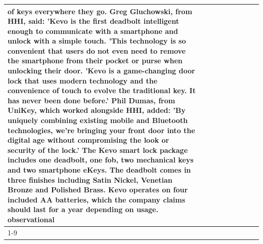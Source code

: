 \begin{table}[H]
\begin{tabular}{lllrlllll}
of keys everywhere they go. Greg Gluchowski, from HHI, said: 'Kevo is the first deadbolt intelligent enough to communicate with a smartphone and unlock with a simple touch. 'This technology is so convenient that users do not even need to remove the smartphone from their pocket or purse when unlocking their door. 'Kevo is a game-changing door lock that uses modern technology and the convenience of touch to evolve the traditional key. It has never been done before.' Phil Dumas, from UniKey, which worked alongside HHI, added: 'By uniquely combining existing mobile and Bluetooth technologies, we’re bringing your front door into the digital age without compromising the look or security of the lock.' The Kevo smart lock package includes one deadbolt, one fob, two mechanical keys and two smartphone eKeys. The deadbolt comes in three finishes including Satin Nickel, Venetian Bronze and Polished Brass. Kevo operates on four included AA batteries, which the company claims should last for a year depending on usage. observational \\
\cline{1-9}

\end{tabular}
\end{table}
